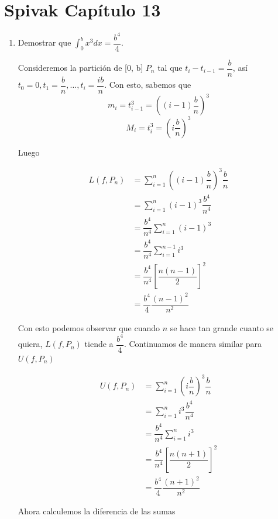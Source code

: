 \documentclass{report}
\begin{document}

    \section*{Spivak Capítulo 13}

    \begin{enumerate}
        \item Demostrar que $\int_{0}^{b}x^3dx = \dfrac{b^4}{4}$.

        Consideremos la partición de [0, b] $P_n$ tal que $t_i - t_{i-1} = \dfrac{b}{n}$, así $t_0 = 0, t_1 = \dfrac{b}{n}, \dots , t_i =\dfrac{ib}{n}$. Con esto, sabemos que
        $$m_i = t_{i-1}^3 = \left((i-1)\dfrac{b}{n}\right)^3$$
        $$M_i = t_{i}^3 = \left(i\dfrac{b}{n}\right)^3$$

        Luego

        \begin{align*}
            L(f, P_n) &= \sum_{i=1}^{n}\left((i-1)\dfrac{b}{n}\right)^3\dfrac{b}{n}\\
            &= \sum_{i=1}^{n}(i-1)^3\dfrac{b^4}{n^4}\\
            &= \dfrac{b^4}{n^4} \sum_{i=1}^{n}(i-1)^3\\
            &= \dfrac{b^4}{n^4} \sum_{i=1}^{n-1}i^3\\
            &= \dfrac{b^4}{n^4} \left[\dfrac{n(n-1)}{2}\right]^2\\
            &= \dfrac{b^4}{4} \dfrac{(n-1)^2}{n^2}
        \end{align*}

        Con esto podemos observar que cuando $n$ se hace tan grande cuanto se quiera, $L(f, P_n)$ tiende a $\dfrac{b^4}{4}$. Continuamos de manera similar para $U(f, P_n)$

        \begin{align*}
            U(f, P_n) &= \sum_{i=1}^{n}\left(i\dfrac{b}{n}\right)^3\dfrac{b}{n}\\
            &= \sum_{i=1}^{n}i^3\dfrac{b^4}{n^4}\\
            &= \dfrac{b^4}{n^4} \sum_{i=1}^{n}i^3\\
            &= \dfrac{b^4}{n^4} \left[\dfrac{n(n+1)}{2}\right]^2\\
            &= \dfrac{b^4}{4} \dfrac{(n+1)^2}{n^2}
        \end{align*}

        Ahora calculemos la diferencia de las sumas


\end{enumerate}
\end{document}
